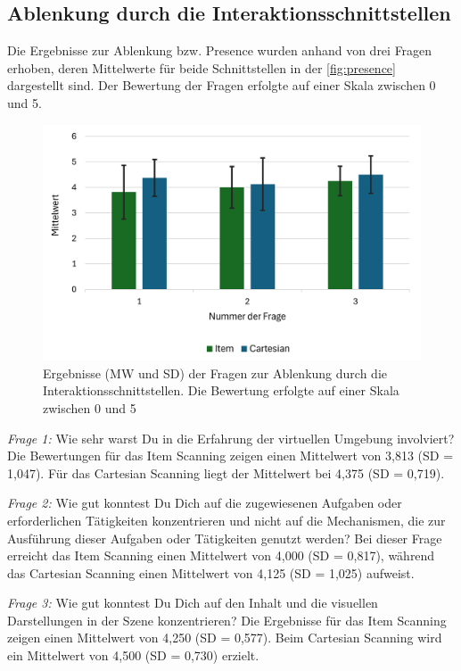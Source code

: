 \subsection{Ablenkung durch die Interaktionsschnittstellen}

Die Ergebnisse zur Ablenkung bzw. Presence wurden anhand von drei Fragen erhoben, deren Mittelwerte für beide Schnittstellen in der \autoref{fig:presence} dargestellt sind. Der Bewertung der Fragen erfolgte auf einer Skala zwischen 0 und 5.  

\begin{figure}[tbh]
    \centering
    \includegraphics{images/Results/Fragen-zur-Presence-Ablenkung.png}
    \caption{Ergebnisse (MW und SD) der Fragen zur Ablenkung durch die Interaktionsschnittstellen. Die Bewertung erfolgte auf einer Skala zwischen 0 und 5}
    \label{fig:presence}
\end{figure}

\textit{Frage 1:} Wie sehr warst Du in die Erfahrung der virtuellen Umgebung involviert?
Die Bewertungen für das Item Scanning zeigen einen Mittelwert von 3,813 (SD = 1,047). Für das Cartesian Scanning liegt der Mittelwert bei 4,375 (SD = 0,719).

\textit{Frage 2:} Wie gut konntest Du Dich auf die zugewiesenen Aufgaben oder erforderlichen Tätigkeiten konzentrieren und nicht auf die Mechanismen, die zur Ausführung dieser Aufgaben oder Tätigkeiten genutzt werden?
Bei dieser Frage erreicht das Item Scanning einen Mittelwert von 4,000 (SD = 0,817), während das Cartesian Scanning einen Mittelwert von 4,125 (SD = 1,025) aufweist.

\textit{Frage 3:} Wie gut konntest Du Dich auf den Inhalt und die visuellen Darstellungen in der Szene konzentrieren?
Die Ergebnisse für das Item Scanning zeigen einen Mittelwert von 4,250 (SD = 0,577). Beim Cartesian Scanning wird ein Mittelwert von 4,500 (SD = 0,730) erzielt.


